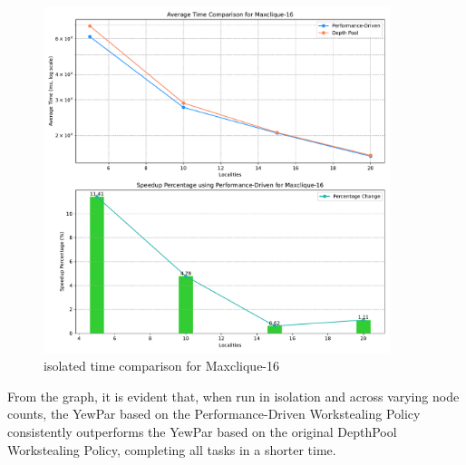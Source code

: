 \documentclass{mproj}
\begin{document}
\begin{figure}[h]
    \centering %
    \includegraphics[width=0.9\textwidth]{images/time_comparison_max_solo.pdf} %
    \caption{isolated time comparison for Maxclique-16} %
    \label{fig:time_comparison_max_solo} %
\end{figure}
\FloatBarrier

From the graph, it is evident that, when run in isolation and across varying node counts,
the YewPar based on the Performance-Driven Workstealing Policy consistently outperforms the YewPar based on the original DepthPool Workstealing Policy,
completing all tasks in a shorter time.
\end{document}
